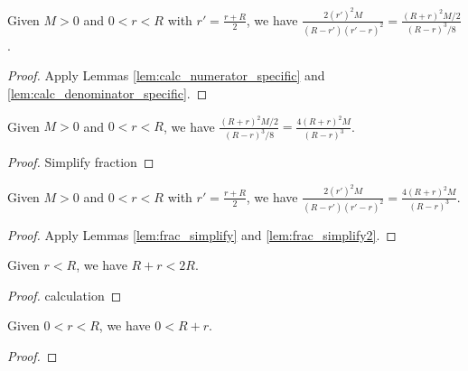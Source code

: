 
\begin{lemma} \label{lem:frac_simplify} \leanok
Given $M>0$ and $0 < r < R$ with $r'=\frac{r+R}{2}$, we have $\frac{2(r')^2M}{(R-r')(r'-r)^2} = \frac{(R+r)^2 M/2}{(R-r)^3/8}$.
\end{lemma}
\begin{proof}\leanok
{}
Apply Lemmas \ref{lem:calc_numerator_specific} and \ref{lem:calc_denominator_specific}.
\end{proof}


\begin{lemma} \label{lem:frac_simplify2} \leanok
Given $M>0$ and $0 < r < R$, we have $\frac{(R+r)^2 M/2}{(R-r)^3/8} = \frac{4(R+r)^2 M}{(R-r)^3}$.
\end{lemma}
\begin{proof}\leanok
Simplify fraction
\end{proof}


\begin{lemma} \label{lem:frac_simplify3} \leanok
Given $M>0$ and $0 < r < R$ with $r'=\frac{r+R}{2}$, we have $\frac{2(r')^2M}{(R-r')(r'-r)^2} = \frac{4(R+r)^2 M}{(R-r)^3}$.
\end{lemma}
\begin{proof}\leanok
{}
Apply Lemmas \ref{lem:frac_simplify} and \ref{lem:frac_simplify2}.
\end{proof}



\begin{lemma}\label{lem:ineq_R_plus_r_lt_2R} \leanok
Given $r < R$, we have $R+r < 2R$.
\end{lemma}
\begin{proof}\leanok
calculation
\end{proof}



\begin{lemma}\label{lem:R_plus_r_is_positive} \leanok
Given $0 < r < R$, we have $0 < R+r$.
\end{lemma}
\begin{proof}\leanok
\end{proof}

